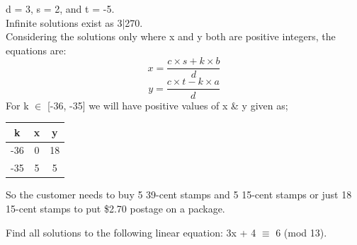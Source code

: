 \documentclass[a4paper]{exam}
\begin{document}
\begin{questions}
\begin{solution}
\begin{table}[H]
\begin{center}
\begin{tabular}{|c|c|c|c|c|c|c|c|c|c|}
                    \end{tabular}
                \end{center}
            \end{table}
            d = 3, s = 2, and t = -5.\\
            Infinite solutions exist as 3|270.\\
            Considering the solutions only where x and y both are positive integers, the equations are:
            \[
                x = \frac{c \times s + k \times b}{d}
            \]
            \[
                y = \frac{c \times t - k \times a}{d}
            \]
            For k $\in$ [-36, -35] we will have positive values of x \& y given as;
            \begin{table}[H]
                \begin{center}
                    \begin{tabular}{|c|c|c|}
                    \hline
                    \textbf{k} & \textbf{x} & \textbf{y} \\ \hline
                    -36        & 0        & 18         \\ \hline
                    -35        & 5        & 5         \\ \hline
                    \end{tabular}
                \end{center}
            \end{table}
            So the customer needs to buy 5 39-cent stamps and 5 15-cent stamps or just 18 15-cent stamps to put \$2.70 postage on a package.
        \end{solution}

        \question[10]
        Find all solutions to the following linear equation: 3x + 4 $\equiv$ 6 (mod 13).


\end{questions}
\end{document}
